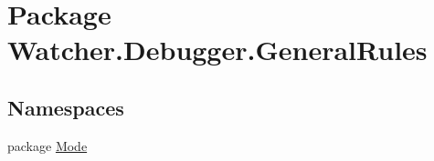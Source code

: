 \hypertarget{namespace_watcher_1_1_debugger_1_1_general_rules}{\section{Package Watcher.\+Debugger.\+General\+Rules}
\label{namespace_watcher_1_1_debugger_1_1_general_rules}
}
\subsection*{Namespaces}
\begin{DoxyCompactItemize}
\item 
package \hyperlink{namespace_watcher_1_1_debugger_1_1_general_rules_1_1_mode}{Mode}
\end{DoxyCompactItemize}
